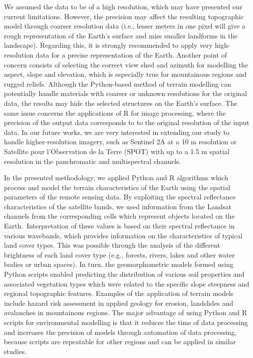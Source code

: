 \documentclass[jimaging,article,accept,pdftex,moreauthors]{Definitions/mdpi}
\begin{document}
{We }assumed the data to be of a high resolution, {which may have presented} our current limitations{. }However, {the precision }may affect the resulting topographic model through coarser{ }resolution data (i.e., lesser meters in one pixel will give a rough representation of the Earth's surface and miss smaller landforms in the landscape). Regarding this, it is strongly recommended to apply {very }high-resolution data for a precise representation of the Earth. Another point of concern {consists of selecting the} correct view shed and azimuth for modelling the aspect, slope and elevation, which is {especially} true for{ }mountainous regions and rugged reliefs.{ }Although the Python-based method of terrain modelling can potentially handle materials with coarser or unknown resolutions for the original data, the results may {hide the} selected structures on the Earth's surface. The same {issue} concerns the applications of R for image processing, {where the} precision {of the output data corresponds to } to the original resolution of the input {data}. In our future works, we are very interested in extending our {study} to handle higher-resolution imagery, such as Sentinel 2A at a 10 m resolution or Satellite pour l'Observation de la Terre (SPOT) with up to a 1.5 m spatial resolution in the panchromatic and multispectral channels.%

{In the presented methodology, we} applied Python and R algorithms which {process and model} the terrain characteristics of the Earth {using the spatial parameters of the remote sensing data}. By exploiting the {spectral reflectance} characteristics of the satellite bands, we {used information} from {the Landsat channels from} the {corresponding} cells which {represent} objects located on the Earth.~Interpretation of these values is based on their spectral reflectance in various wavebands, which {provides} information {on} the characteristics of typical land cover types. This was possible through the analysis of the different brightness of each land cover type (e.g., forests, rivers, lakes and other water bodies {or} urban spaces). In turn, the geomorphometric models formed using Python scripts enabled predicting the distribution of various soil properties and associated vegetation types which were related to the specific slope steepness and regional topographic features. {Examples of} the application of terrain models {include} hazard risk assessment in applied geology{ for }erosion, landslides and avalanches{ }in mountainous regions. The major advantage of using Python and R scripts for environmental modelling is that it reduces the time of data processing and increases the precision of models through automation of data processing, {because} scripts {are repeatable} for other regions and {can be }applied in similar studies.
\end{document}
